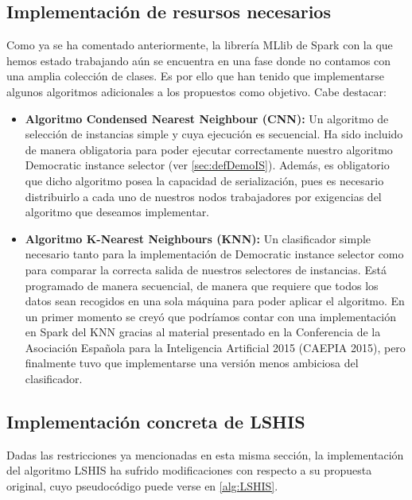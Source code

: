 \subsection{Implementación de resursos necesarios}\label{sec:ImplRecursosAdicionales}

Como ya se ha comentado anteriormente, la librería MLlib de Spark con la que hemos estado trabajando aún se encuentra en una fase donde no contamos con una amplia colección de clases. Es por ello que han tenido que implementarse algunos algoritmos adicionales a los propuestos como objetivo. Cabe destacar:

\begin{itemize}
\item \textbf{Algoritmo Condensed Nearest Neighbour (CNN):} Un algoritmo de selección de instancias simple y cuya ejecución es secuencial. Ha sido incluido de manera obligatoria para poder ejecutar correctamente nuestro algoritmo Democratic instance selector (ver \ref{sec:defDemoIS}). Además, es obligatorio que dicho algoritmo posea la capacidad de serialización, pues es necesario distribuirlo a cada uno de nuestros nodos trabajadores por exigencias del algoritmo que deseamos implementar.
\item  \textbf{Algoritmo K-Nearest Neighbours (KNN):} Un clasificador simple necesario tanto para la implementación de Democratic instance selector como para comparar la correcta salida de nuestros selectores de instancias. Está programado de manera secuencial, de manera que requiere que todos los datos sean recogidos en una sola máquina para poder aplicar el algoritmo. En un primer momento se creyó que podríamos contar con una implementación en Spark del KNN gracias al material presentado en la Conferencia de la Asociación Española para la Inteligencia Artificial 2015 (CAEPIA 2015), pero finalmente tuvo que implementarse una versión menos ambiciosa del clasificador.
\end{itemize}


\subsection{Implementación concreta de LSHIS}

Dadas las restricciones ya mencionadas en esta misma sección, la implementación del algoritmo LSHIS ha sufrido modificaciones con respecto a su propuesta original, cuyo pseudocódigo puede verse en \ref{alg:LSHIS}.

